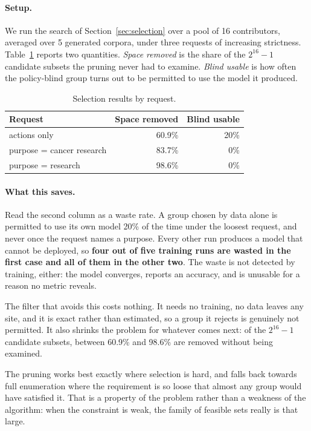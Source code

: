 \documentclass[sigconf,anonymous,review]{acmart}
\begin{document}
\paragraph{Setup.} We run the search of Section~\ref{sec:selection} over a pool of
16 contributors, averaged over 5 generated corpora, under three requests of
increasing strictness.
Table~\ref{tab:selection} reports two quantities. \emph{Space removed} is the
share of the $2^{16}-1$ candidate subsets the pruning never had to examine.
\emph{Blind usable} is how often the policy-blind group turns out to be permitted
to use the model it produced.

\begin{table}[h]
\caption{Selection results by request.}
\label{tab:selection}
\begin{tabular}{lrr}
\toprule
Request & Space removed & Blind usable \\
\midrule
actions only & 60.9\% & 20\% \\
purpose = cancer research & 83.7\% & 0\% \\
purpose = research & 98.6\% & 0\% \\
\bottomrule
\end{tabular}
\end{table}

\paragraph{What this saves.} Read the second column as a waste rate. A group
chosen by data alone is permitted to use its own model 20\% of the time under the
loosest request, and never once the request names a purpose. Every other run
produces a model that cannot be deployed, so \textbf{four out of five training
runs are wasted in the first case and all of them in the other two}. The waste is
not detected by training, either: the model converges, reports an accuracy, and
is unusable for a reason no metric reveals.

The filter that avoids this costs nothing. It needs no training, no data leaves
any site, and it is exact rather than estimated, so a group it rejects is
genuinely not permitted. It also shrinks the problem for whatever comes next: of
the $2^{16}-1$ candidate subsets, between 60.9\% and 98.6\% are removed without
being examined.

The pruning works best exactly where selection is hard, and falls back towards
full enumeration where the requirement is so loose that almost any group would
have satisfied it. That is a property of the problem rather than a weakness of the
algorithm: when the constraint is weak, the family of feasible sets really is that
large.
\end{document}
